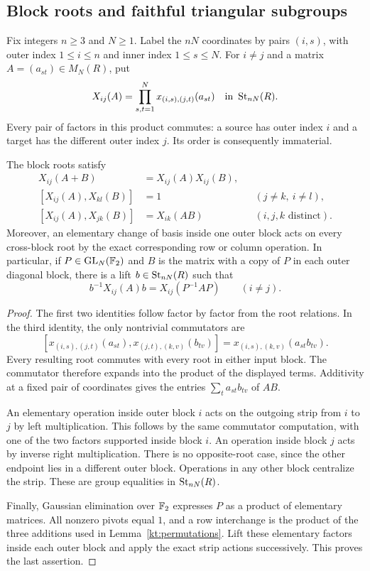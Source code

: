 \subsection{Block roots and faithful triangular subgroups}

Fix integers $n\geq3$ and $N\geq1$.  Label the $nN$ coordinates by pairs
$(i,s)$, with outer index $1\leq i\leq n$ and inner index
$1\leq s\leq N$.  For $i\ne j$ and a matrix
$A=(a_{st})\in M_N(R)$, put
\[
 X_{ij}(A)=\prod_{s,t=1}^{N}x_{(i,s),(j,t)}(a_{st})
       \quad\hbox{in }\operatorname{St}_{nN}(R).
\]
Every pair of factors in this product commutes: a source has outer
index $i$ and a target has the different outer index $j$.  Its order
is consequently immaterial.

\begin{lemma}\label{kt:block-laws}
The block roots satisfy
\begin{align*}
 X_{ij}(A+B)&=X_{ij}(A)X_{ij}(B),\\
 [X_{ij}(A),X_{kl}(B)]&=1
           &&(j\ne k,\ i\ne l),\\
 [X_{ij}(A),X_{jk}(B)]&=X_{ik}(AB)
           &&(i,j,k\text{ distinct}).
\end{align*}
Moreover, an elementary change of basis inside one outer block acts
on every cross-block root by the exact corresponding row or column
operation.  In particular, if $P\in\operatorname{GL}_N(\mathbb F_2)$ and $B$ is the
matrix with a copy of $P$ in each outer diagonal block, there is a
lift $b\in\operatorname{St}_{nN}(R)$ such that
\[
 b^{-1}X_{ij}(A)b=X_{ij}(P^{-1}AP)
 \qquad(i\ne j).
\]
\end{lemma}

\begin{proof}
The first two identities follow factor by factor from the root
relations.  In the third identity, the only nontrivial commutators
are
\[
 [x_{(i,s),(j,t)}(a_{st}),x_{(j,t),(k,v)}(b_{tv})]
       =x_{(i,s),(k,v)}(a_{st}b_{tv}).
\]
Every resulting root commutes with every root in either input block.
The commutator therefore expands into the product of the displayed
terms.  Additivity at a fixed pair of coordinates gives the entries
$\sum_t a_{st}b_{tv}$ of $AB$.

An elementary operation inside outer block $i$ acts on the outgoing
strip from $i$ to $j$ by left multiplication.  This follows by the
same commutator computation, with one of the two factors supported
inside block $i$.  An operation inside block $j$ acts by inverse
right multiplication.  There is no opposite-root case, since the
other endpoint lies in a different outer block.  Operations in any
other block centralize the strip.  These are group equalities in
$\operatorname{St}_{nN}(R)$.

Finally, Gaussian elimination over $\mathbb F_2$ expresses $P$ as a product
of elementary matrices.  All nonzero pivots equal $1$, and a row
interchange is the product of the three additions used in
Lemma~\ref{kt:permutations}.  Lift these elementary factors inside
each outer block and apply the exact strip actions successively.
This proves the last assertion.
\end{proof}

